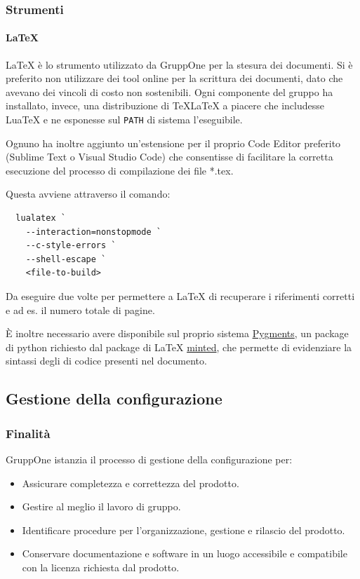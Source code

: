 \documentclass[../norme-di-progetto.tex]{subfiles}
\begin{document}
\subsubsection{Strumenti}

\paragraph{\LaTeX}%
\label{par:LaTeX}
\LaTeX{} è lo strumento utilizzato da GruppOne per la stesura dei documenti. Si è preferito non utilizzare dei tool online per la scrittura dei documenti, dato che avevano dei vincoli di costo non sostenibili.
Ogni componente del gruppo ha installato, invece, una distribuzione di \TeX{}\LaTeX{} a piacere che includesse Lua\TeX{} e ne esponesse sul \verb|PATH| di sistema l'eseguibile.

Ognuno ha inoltre aggiunto un'estensione per il proprio Code Editor preferito (Sublime Text o Visual Studio Code) che consentisse di facilitare la corretta esecuzione del processo di compilazione dei file *.tex.

Questa avviene attraverso il comando:

\begin{verbatim}
  lualatex `
    --interaction=nonstopmode `
    --c-style-errors `
    --shell-escape `
    <file-to-build>
\end{verbatim}

Da eseguire due volte per permettere a \LaTeX{} di recuperare i riferimenti corretti e ad es\@. il numero totale di pagine.

È inoltre necessario avere disponibile sul proprio sistema \href{https://pygments.org/}{Pygments}, un package di python richiesto dal package di \LaTeX{} \href{https://ctan.org/pkg/minted?lang=en}{minted}, che permette di evidenziare la sintassi degli  di codice presenti nel documento.

\subsection{Gestione della configurazione}%
\label{sub:gestione_della_configurazione}

\subsubsection{Finalità}%
\label{subs:gestione_della_configurazione/finalita}

GruppOne istanzia il processo di gestione della configurazione per:
\begin{itemize}
  \item Assicurare completezza e correttezza del prodotto.
  \item Gestire al meglio il lavoro di gruppo.
  \item Identificare procedure per l'organizzazione, gestione e rilascio del prodotto.
  \item Conservare documentazione e software in un luogo accessibile e compatibile con la licenza richiesta dal prodotto.
\end{itemize}
\end{document}
